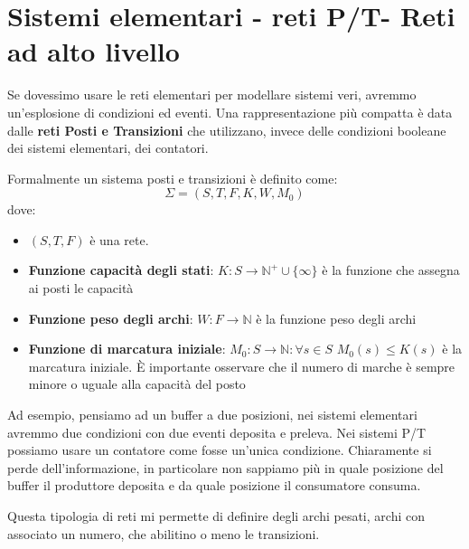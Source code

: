 \section{Sistemi elementari - reti P/T- Reti ad alto livello}
Se dovessimo usare le reti elementari per modellare sistemi veri, avremmo
un'esplosione di condizioni ed eventi. Una rappresentazione più compatta è data
dalle \textbf{reti Posti e Transizioni} che utilizzano, invece delle condizioni
booleane dei sistemi elementari, dei contatori.
\begin{definizione}
    Formalmente un sistema posti e transizioni è definito come:
    \begin{equation}
        \Sigma = (S, T, F, K, W, M_0)
    \end{equation}
    dove:
    \begin{itemize}
        \item $(S, T, F)$ è una rete.
        \item \textbf{Funzione capacità degli stati}: $K: S \to \mathbb{N}^+
                  \cup \{\infty\}$ è la funzione che assegna ai posti le capacità
        \item \textbf{Funzione peso degli archi}: $W: F \to \mathbb{N}$ è la
              funzione peso degli archi
        \item \textbf{Funzione di marcatura iniziale}: $M_0: S \to \mathbb{N}:
                  \forall s \in S$ $M_0(s) \leq K(s)$ è la marcatura iniziale.
              È importante osservare che il numero di marche è sempre minore o
              uguale alla capacità del posto
    \end{itemize}
\end{definizione}
Ad esempio, pensiamo ad un buffer a due posizioni, nei sistemi elementari avremmo
due condizioni con due eventi deposita e preleva. Nei sistemi P/T possiamo usare
un contatore come fosse un'unica condizione. Chiaramente si perde dell'informazione,
in particolare non sappiamo più in quale posizione del buffer il produttore
deposita e da quale posizione il consumatore consuma.

Questa tipologia di reti mi permette di definire degli archi pesati, archi con
associato un numero, che abilitino o meno le transizioni.

